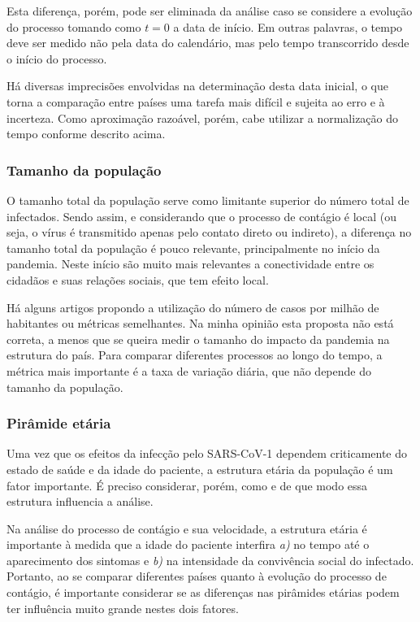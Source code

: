 \documentclass[12pt]{extarticle}
\begin{document}
Esta diferença, porém, pode ser eliminada da análise caso se considere a evolução do processo tomando como $t=0$ a data de início. Em outras palavras, o tempo deve ser medido não pela data do calendário, mas pelo tempo transcorrido desde o início do processo. 

Há diversas imprecisões envolvidas na determinação desta data inicial, o que torna a comparação entre países uma tarefa mais difícil e sujeita ao erro e à incerteza. Como aproximação razoável, porém, cabe utilizar a normalização do tempo conforme descrito acima.

\subsubsection{Tamanho da população}

O tamanho total da população serve como limitante superior do número total de infectados. Sendo assim, e considerando que o processo de contágio é local (ou seja, o vírus é transmitido apenas pelo contato direto ou indireto), a diferença no tamanho total da população é pouco relevante, principalmente no início da pandemia. Neste início são muito mais relevantes a conectividade entre os cidadãos e suas relações sociais, que tem efeito local.

Há alguns artigos propondo a utilização do número de casos por milhão de habitantes ou métricas semelhantes. Na minha opinião esta proposta não está correta, a menos que se queira medir o tamanho do impacto da pandemia na estrutura do país. Para comparar diferentes processos ao longo do tempo, a métrica mais importante é a taxa de variação diária, que não depende do tamanho da população.

\subsubsection{Pirâmide etária}

Uma vez que os efeitos da infecção pelo SARS-CoV-1 dependem criticamente do estado de saúde e da idade do paciente, a estrutura etária da população é um fator importante. É preciso considerar, porém, como e de que modo essa estrutura influencia a análise.

Na análise do processo de contágio e sua velocidade, a estrutura etária é importante à medida que a idade do paciente interfira \textit{a)} no tempo até o aparecimento dos sintomas e \textit{b)} na intensidade da convivência social do infectado. Portanto, ao se comparar diferentes países quanto à evolução do processo de contágio, é importante considerar se as diferenças nas pirâmides etárias podem ter influência muito grande nestes dois fatores. 
\end{document}
